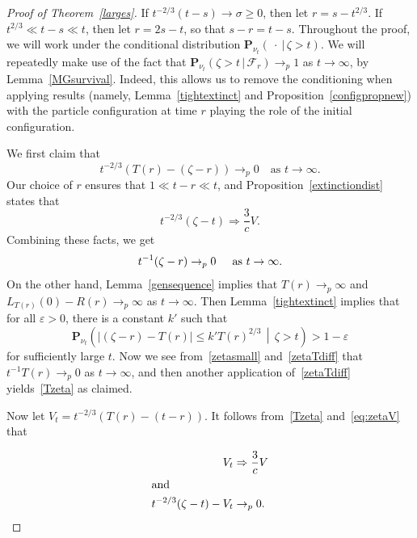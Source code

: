 \documentclass[AHL,Unicode,longabstracts,published]{cedram}
\newcommand*\eps{\varepsilon}
\renewcommand*\P{\mathbf{P}}
\newcommand\F{\mathcal{F}}
\newcommand{\1} {\mathds{1}}
\renewcommand*\to{\rightarrow}
\begin{document}
\begin{proof}[Proof of Theorem~\ref{larges}]
If $t^{-2/3}(t - s) \to \sigma \geq 0$, then let $r = s - t^{2/3}$. If $t^{2/3} \ll t - s \ll t$, then let $r = 2s - t$, so that $s - r = t - s$. Throughout the proof, we will work under the conditional distribution $\P_{\nu_t}(\: \cdot \:|\, \zeta > t)$. We will repeatedly make use of the fact that $\P_{\nu_t}(\zeta > t\,|\,\F_r) \rightarrow_p 1$ as $t \rightarrow \infty$, by Lemma~\ref{MGsurvival}. Indeed, this allows us to remove the conditioning when applying results (namely, Lemma~\ref{tightextinct} and Proposition~\ref{configpropnew}) with the particle configuration at time $r$ playing the role of the initial configuration.

We first claim that
\begin{equation}\label{Tzeta}
t^{-2/3}\left(T(r) - (\zeta - r)\right) \rightarrow_p 0 \quad\text{as }t \rightarrow \infty.
\end{equation}
Our choice of $r$ ensures that $1 \ll t - r \ll t$, and Proposition~\ref{extinctiondist} states that
\begin{equation}\label{eq:zetaV}
t^{-2/3}(\zeta - t) \Rightarrow \frac{3}{c}V.
\end{equation}
Combining these facts, we get
\begin{equation}\label{zetasmall}
t^{-1}(\zeta - r) \rightarrow_p 0 \hspace{.2in}\mbox{as }t \rightarrow \infty.
\end{equation}
On the other hand, Lemma~\ref{gensequence} implies that $T(r) \rightarrow_p \infty$ and $L_{T(r)}(0) - R(r) \rightarrow_p \infty$ as $t \rightarrow \infty$. Then Lemma~\ref{tightextinct} implies that for all $\eps > 0$, there is a constant $k'$ such that
\begin{equation}\label{zetaTdiff}
\P_{\nu_t}\left(\left|(\zeta - r) - T(r)\right| \leq k' T(r)^{2/3} \,\middle|\, \zeta > t\right) > 1 - \eps
\end{equation}
for sufficiently large $t$. Now we see from~\eqref{zetasmall} and~\eqref{zetaTdiff} that $t^{-1}T(r) \rightarrow_p 0$ as $t \rightarrow \infty$, and then another application of~\eqref{zetaTdiff} yields~\eqref{Tzeta} as claimed.

Now let $V_t = t^{-2/3}(T(r) - (t - r))$. It follows from~\eqref{Tzeta} and~\eqref{eq:zetaV} that

\begin{align}
V_t &\Rightarrow \frac{3}{c} V\label{Tudist}
\\
\intertext{and}
t^{-2/3}(\zeta - t) - V_t &\rightarrow_p 0.\label{simcon1}
\end{align}


\end{proof}
\end{document}
